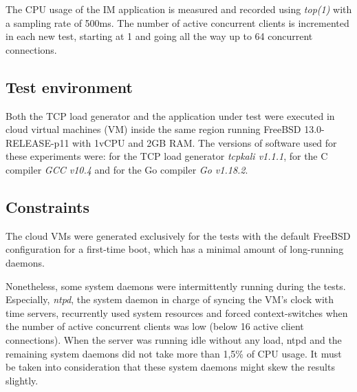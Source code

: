 The CPU usage of the IM application is measured and recorded using \textit{top(1)} with a sampling rate of 500ms. The number of active concurrent clients is incremented in each new test, starting at 1 and going all the way up to 64 concurrent connections.

\subsection{Test environment}
Both the TCP load generator and the application under test were executed in cloud virtual machines (VM) inside the same region running FreeBSD 13.0-RELEASE-p11 with 1vCPU and 2GB RAM. The versions of software used for these experiments were: for the TCP load generator \textit{tcpkali v1.1.1}, for the C compiler \textit{GCC v10.4} and for the Go compiler \textit{Go v1.18.2}.

\subsection{Constraints}
The cloud VMs were generated exclusively for the tests with the default FreeBSD configuration for a first-time boot, which has a minimal amount of long-running daemons.

Nonetheless, some system daemons were intermittently running during the tests. Especially, \textit{ntpd}, the system daemon in charge of syncing the VM's clock with time servers, recurrently used system resources and forced context-switches when the number of active concurrent clients was low (below 16 active client connections). When the server was running idle without any load, ntpd and the remaining system daemons did not take more than 1,5\% of CPU usage. It must be taken into consideration that these system daemons might skew the results slightly.

